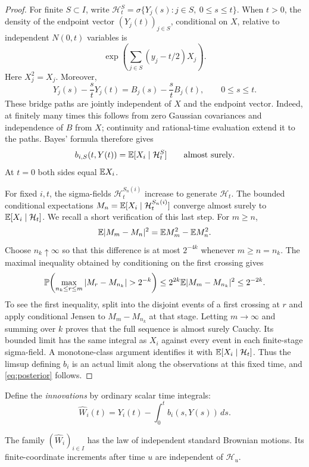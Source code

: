 \begin{proof}
For finite $S\subset I$, write
$\mathcal H_t^S=\sigma\{Y_j(s):j\in S,\ 0\le s\le t\}$.
When $t>0$, the density of the endpoint vector $(Y_j(t))_{j\in S}$,
conditional on $X$, relative to independent $N(0,t)$ variables is
\[
 \exp\!\left(\sum_{j\in S}(y_j-t/2)X_j\right).
\]
Here $X_j^2=X_j$. Moreover,
\[
 Y_j(s)-\frac{s}{t}Y_j(t)
 =B_j(s)-\frac{s}{t}B_j(t),\qquad 0\le s\le t.
\]
These bridge paths are jointly independent of $X$ and the endpoint vector.
Indeed, at finitely many times this follows from zero Gaussian covariances
and independence of $B$ from $X$; continuity and rational-time evaluation
extend it to the paths. Bayes' formula therefore gives
\[
 b_{i,S}(t,Y(t))=\mathbb E[X_i\mid\mathcal H_t^S]
 \qquad\text{almost surely}.
\]
At $t=0$ both sides equal $\mathbb E X_i$.

For fixed $i,t$, the sigma-fields $\mathcal H_t^{S_n(i)}$ increase to generate
$\mathcal H_t$. The bounded conditional expectations
$M_n=\mathbb E[X_i\mid\mathcal H_t^{S_n(i)}]$ converge almost surely to
$\mathbb E[X_i\mid\mathcal H_t]$. We recall a short verification of this last step.
For $m\ge n$,
\[
 \mathbb E|M_m-M_n|^2=\mathbb E M_m^2-\mathbb E M_n^2.
\]
Choose $n_k\uparrow\infty$ so that this difference is at most $2^{-4k}$
whenever $m\ge n=n_k$. The maximal inequality obtained by conditioning on
the first crossing gives
\[
 \P\!\left(\max_{n_k\le r\le m}|M_r-M_{n_k}|>2^{-k}\right)
 \le 2^{2k}\E|M_m-M_{n_k}|^2\le2^{-2k}.
\]
To see the first inequality, split into the disjoint events of a first
crossing at $r$ and apply conditional Jensen to $M_m-M_{n_k}$ at that stage.
Letting $m\to\infty$ and summing over $k$ proves that the full sequence is
almost surely Cauchy. Its bounded limit has the same integral as $X_i$
against every event in each finite-stage sigma-field. A monotone-class
argument identifies it with $\mathbb E[X_i\mid\mathcal H_t]$.
Thus the limsup defining $b_i$ is an actual limit along the observations
at this fixed time, and \eqref{eq:posterior} follows.
\end{proof}

Define the \emph{innovations} by ordinary scalar time integrals:
\begin{equation}\label{eq:innovation}
 \widehat W_i(t)=Y_i(t)-\int_0^t b_i(s,Y(s))\,ds.
\end{equation}

\begin{lemma}\label{lem:innovation}
The family $(\widehat W_i)_{i\in I}$ has the law of independent standard
Brownian motions. Its finite-coordinate increments after time $u$ are
independent of $\mathcal H_u$.
\end{lemma}

